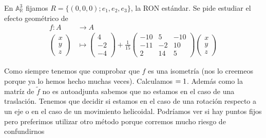 \documentclass[14pt]{book}
\begin{document}
\begin{ej}
		En $\mathbb{A}_\mathbb{R}^3$ fijamos $R = \{(0,0,0); e_1, e_2, e_3\}$, la RON estándar. Se pide estudiar el efecto geométrico de
	\begin{align*}
	f: A& \to A \\
	\left(\begin{array}{c}
	x \\ y \\ z
	\end{array}\right) &\mapsto
	\left(\begin{array}{c}
	4 \\ -2 \\ -4
	\end{array}\right)  + 
	\frac{1}{15}
	\left(\begin{array}{ccc}
	-10 & 5 & -10 \\
	-11 & -2 & 10 \\
	2 & 14 & 5
	\end{array}\right)\left(\begin{array}{c}
	x \\ y \\ z
	\end{array}\right)
	\end{align*}
	
	Como siempre tenemos que comprobar que $f$ es una isometría (nos lo creemeos porque ya lo hemos hecho muchas veces). Calculamos $\def \tilde{f} = 1$. Además como la matríz de $\tilde{f}$ no es autoadjunta sabemos que no estamos en el caso de una traslación. Tenemos que decidir si estamos en el caso de una rotación respecto a un eje o en el caso de un movimiento helicoidal. Podríamos ver si hay puntos fijos pero preferimos utilizar otro método porque corremos mucho riesgo de confundirnos
	

\end{ej}
\end{document}
